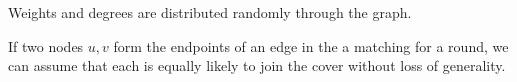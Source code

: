 \begin{assm}
\label{assm:distribution}
Weights and degrees are distributed randomly through the graph.
\end{assm}
\begin{assm}
\label{assm:likelihood}
If two nodes $u,v$ form the endpoints of an edge in the a matching for a round, we can assume that each is equally likely to join the cover without loss of generality.
\end{assm}
